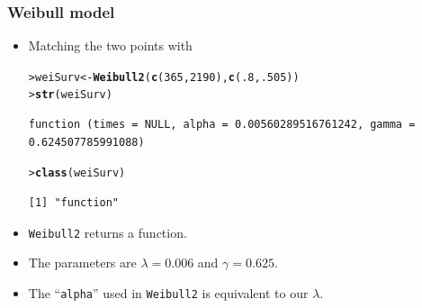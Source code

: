\documentclass[10pt]{beamer}\usepackage[]{graphicx}\usepackage[]{color}
\makeatletter
\newcommand{\hlnum}[1]{\textcolor[rgb]{0.686,0.059,0.569}{#1}}%
\newcommand{\hlstd}[1]{\textcolor[rgb]{0.345,0.345,0.345}{#1}}%
\newcommand{\hlkwb}[1]{\textcolor[rgb]{0.69,0.353,0.396}{#1}}%
\newcommand{\hlkwd}[1]{\textcolor[rgb]{0.737,0.353,0.396}{\textbf{#1}}}%
\newenvironment{kframe}{%
 \def\at@end@of@kframe{}%
 \ifinner\ifhmode%
  \def\at@end@of@kframe{\end{minipage}}%
  \begin{minipage}{\columnwidth}%
 \fi\fi%
 \def\FrameCommand##1{\hskip\@totalleftmargin \hskip-\fboxsep
 \colorbox{shadecolor}{##1}\hskip-\fboxsep
     \hskip-\linewidth \hskip-\@totalleftmargin \hskip\columnwidth}%
 \MakeFramed {\advance\hsize-\width
   \@totalleftmargin\z@ \linewidth\hsize
   \@setminipage}}%
 {\par\unskip\endMakeFramed%
 \at@end@of@kframe}
\newenvironment{knitrout}{}{} %
\renewenvironment{knitrout}{\setlength{\topsep}{-.2mm}}{}
\newcommand{\code}[1]{{\texttt{#1}}}
\makeatother
\begin{document}
\begin{frame}[fragile]
  \frametitle{Weibull model}
  \begin{itemize}
  \item Matching the two points with
\begin{knitrout}\scriptsize
{}\color{fgcolor}\begin{kframe}
\begin{alltt}
\hlstd{> }\hlstd{weiSurv} \hlkwb{<-} \hlkwd{Weibull2}\hlstd{(}\hlkwd{c}\hlstd{(}\hlnum{365}\hlstd{,} \hlnum{2190}\hlstd{),} \hlkwd{c}\hlstd{(}\hlnum{.8}\hlstd{,} \hlnum{.505}\hlstd{))}
\hlstd{> }\hlkwd{str}\hlstd{(weiSurv)}
\end{alltt}
\begin{verbatim}
function (times = NULL, alpha = 0.00560289516761242, gamma = 0.624507785991088)  
\end{verbatim}
\begin{alltt}
\hlstd{> }\hlkwd{class}\hlstd{(weiSurv)}
\end{alltt}
\begin{verbatim}
[1] "function"
\end{verbatim}
\end{kframe}
\end{knitrout}
\item \code{Weibull2} returns a function.
\item The parameters are $\lambda = 0.006$ and $\gamma = 0.625$.
\item The ``\code{alpha}'' used in \code{Weibull2} is equivalent to our $\lambda$.
\end{itemize}
\end{frame}
\end{document}

